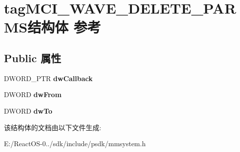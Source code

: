 \hypertarget{structtag_m_c_i___w_a_v_e___d_e_l_e_t_e___p_a_r_m_s}{}\section{tag\+M\+C\+I\+\_\+\+W\+A\+V\+E\+\_\+\+D\+E\+L\+E\+T\+E\+\_\+\+P\+A\+R\+M\+S结构体 参考}
\label{structtag_m_c_i___w_a_v_e___d_e_l_e_t_e___p_a_r_m_s}
\subsection*{Public 属性}
\begin{DoxyCompactItemize}
\item 
\mbox{\label{structtag_m_c_i___w_a_v_e___d_e_l_e_t_e___p_a_r_m_s_a8c2e009b4490420ad8e4535026b4037d}} 
D\+W\+O\+R\+D\+\_\+\+P\+TR {\bfseries dw\+Callback}
\item 
\mbox{\label{structtag_m_c_i___w_a_v_e___d_e_l_e_t_e___p_a_r_m_s_a83acc2178b1529b939fa078aeb45859d}} 
D\+W\+O\+RD {\bfseries dw\+From}
\item 
\mbox{\label{structtag_m_c_i___w_a_v_e___d_e_l_e_t_e___p_a_r_m_s_a8f6604f9bd960d1ef53d69481971c002}} 
D\+W\+O\+RD {\bfseries dw\+To}
\end{DoxyCompactItemize}


该结构体的文档由以下文件生成\+:\begin{DoxyCompactItemize}
\item 
E\+:/\+React\+O\+S-\/0../sdk/include/psdk/mmsystem.\+h\end{DoxyCompactItemize}
